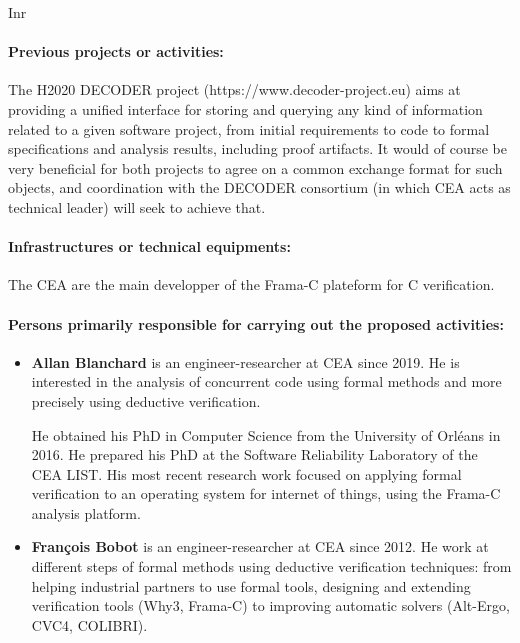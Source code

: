 \begin{sitedescription}{Inr}

\paragraph{Previous projects or activities:}


The H2020 DECODER project (https://www.decoder-project.eu) aims at
providing a unified interface for storing and querying any kind of
information related to a given software project, from initial
requirements to code to formal specifications and analysis results,
including proof artifacts. It would of course be very beneficial for
both projects to agree on a common exchange format for such objects, and
coordination with the DECODER consortium (in which CEA acts as technical
leader) will seek to achieve that.

\paragraph{Infrastructures or technical equipments:}


The CEA are the main developper of the Frama-C plateform for C verification.

\paragraph{Persons primarily responsible for carrying out the proposed activities:}

\begin{itemize} %


\item{\bf Allan Blanchard} is an engineer-researcher at CEA since 2019. He is
  interested in the analysis of concurrent code using formal methods and more
  precisely using deductive verification.

  He obtained his PhD in Computer Science from the University of Orléans in
  2016. He prepared his PhD at the Software Reliability Laboratory of the CEA
  LIST. His most recent research work focused on applying formal verification to
  an operating system for internet of things, using the Frama-C analysis
  platform.
\item{\bf François Bobot} is an engineer-researcher at CEA since 2012. He work
  at different steps of formal methods using deductive verification techniques:
  from helping industrial partners to use formal tools, designing and extending
  verification tools (Why3, Frama-C) to improving automatic solvers (Alt-Ergo,
  CVC4, COLIBRI).
\end{itemize}


\end{sitedescription}

